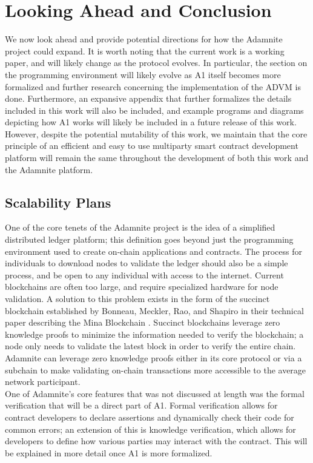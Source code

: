 \documentclass[conference]{IEEEtran}
\begin{document}
\section{Looking Ahead and Conclusion}
We now look ahead and provide potential directions for how the Adamnite project could expand. It is worth noting that the current work is a working paper, and will likely change as the protocol evolves. In particular, the section on the programming environment will likely evolve as A1 itself becomes more formalized and further research concerning the implementation of the ADVM is done. Furthermore, an expansive appendix that further formalizes the details included in this work will also be included, and example programs and diagrams depicting how A1 works will likely be included in a future release of this work. However, despite the potential mutability of this work, we maintain that the core principle of an efficient and easy to use multiparty smart contract development platform will remain the same throughout the development of both this work and the Adamnite platform. 

\subsection{Scalability Plans}
One of the core tenets of the Adamnite project is the idea of a simplified distributed ledger platform; this definition goes beyond just the programming environment used to create on-chain applications and contracts. The process for individuals to download nodes to validate the ledger should also be a simple process, and be open to any individual with access to the internet. Current blockchains are often too large, and require specialized hardware for node validation. A solution to this problem exists in the form of the succinct blockchain established by Bonneau, Meckler, Rao, and Shapiro in their technical paper describing the Mina Blockchain \cite{bonneau2020Mina}. Succinct blockchains leverage zero knowledge proofs to minimize the information needed to verify the blockchain; a node only needs to validate the latest block in order to verify the entire chain. Adamnite can leverage zero knowledge proofs either in its core protocol or via a subchain to make validating on-chain transactions more accessible to the average network participant.\\
One of Adamnite's core features that was not discussed at length was the formal verification that will be a direct part of A1. Formal verification allows for contract developers to declare assertions and dynamically check their code for common errors; an extension of this is knowledge verification, which allows for developers to define how various parties may interact with the contract. This will be explained in more detail once A1 is more formalized.
\end{document}
